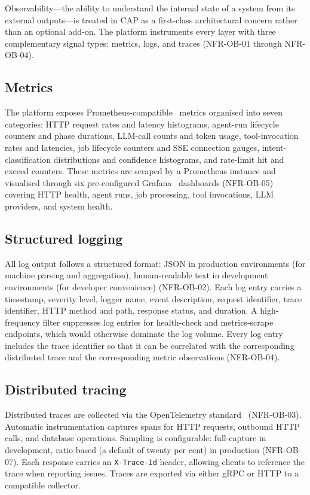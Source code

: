 \documentclass[a4paper]{sapthesis}
\begin{document}
Observability---the ability to understand the internal state of a system
from its external outputs---is treated in CAP as a first-class
architectural concern rather than an optional add-on.  The platform
instruments every layer with three complementary signal types: metrics,
logs, and traces (NFR-OB-01 through NFR-OB-04).

\subsection{Metrics}

The platform exposes Prometheus-compatible~\cite{prometheus2023} metrics
organised into seven categories: HTTP request rates and latency
histograms, agent-run lifecycle counters and phase durations, LLM-call
counts and token usage, tool-invocation rates and latencies, job
lifecycle counters and SSE connection gauges, intent-classification
distributions and confidence histograms, and rate-limit hit and exceed
counters.  These metrics are scraped by a Prometheus instance and
visualised through six pre-configured Grafana~\cite{grafana2023}
dashboards (NFR-OB-05) covering HTTP health, agent runs, job processing,
tool invocations, LLM providers, and system health.

\subsection{Structured logging}

All log output follows a structured format: JSON in production
environments (for machine parsing and aggregation), human-readable text in
development environments (for developer convenience) (NFR-OB-02).  Each
log entry carries a timestamp, severity level, logger name, event
description, request identifier, trace identifier, HTTP method and path,
response status, and duration.  A high-frequency filter suppresses log
entries for health-check and metrics-scrape endpoints, which would
otherwise dominate the log volume.  Every log entry includes the trace
identifier so that it can be correlated with the corresponding distributed
trace and the corresponding metric observations (NFR-OB-04).

\subsection{Distributed tracing}

Distributed traces are collected via the OpenTelemetry
standard~\cite{opentelemetry2023} (NFR-OB-03).  Automatic instrumentation captures spans for HTTP requests,
outbound HTTP calls, and database operations.  Sampling is
configurable: full-capture in development, ratio-based (a default of
twenty per cent) in production (NFR-OB-07).  Each response carries an
\texttt{X-Trace-Id} header, allowing clients to reference the trace when
reporting issues.  Traces are exported via either gRPC or HTTP to a
compatible collector.
\end{document}

